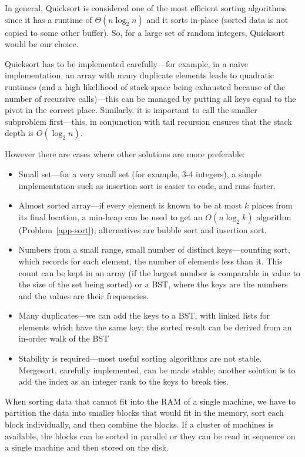 In general, Quicksort is considered one of the most efficient sorting
algorithms since it has a runtime of $\Theta(n\log_2 n)$ and it sorts
in-place (sorted data is not copied to some other buffer). 
So, for a large set of random integers, Quicksort would be our choice.

Quicksort has to be implemented carefully---for example, in a na\"{i}ve
implementation, an array with many duplicate
elements leads to quadratic runtimes (and a high likelihood of stack space
being exhausted because of the number of recursive calls)---this can
be managed by putting all keys equal to the pivot in the correct place. 
Similarly, it is important to call the smaller subproblem first---this, 
in conjunction with tail recursion ensures that the stack depth is $O(\log_2 n)$.

However there are cases where other solutions are more preferable:
\begin{itemize}
\itemsep 1pt
\item {Small set}---for a very small set (for example, 3-4 integers),
  a simple implementation such as insertion sort is easier to code, and runs faster.
\item {Almost sorted array}---if every element is known to be at most $k$ places from its 
final location, a min-heap can be used to get an $O(n\log_2 k)$ algorithm (Problem~\ref{app-sort}); alternatives
are bubble sort and insertion sort.
\item {Numbers from a small range, small number of distinct keys}---counting sort, which records for
each element, the number of elements less than it. This count can be kept
in an array (if the largest number is comparable in value to the size of the set being sorted) or a BST, where the keys are the numbers and the values are their
frequencies.
\item {Many duplicates}---we can add the keys to a BST, with linked lists for elements 
which have the same key; the sorted result can be derived from an in-order walk of the BST
\item {Stability is required}---most useful sorting algorithms are not stable.
Mergesort, carefully implemented, can be made stable; another solution is to add
the index as an integer rank to the keys to break ties.
\end{itemize}

When sorting data that cannot fit into the RAM of a single machine, we have to partition the data into
smaller blocks that would fit in the memory, sort each block individually, and then combine the blocks. If a cluster of machines is available, 
the blocks can be sorted in parallel or they can be read in sequence
on a single machine and then stored on the disk.

